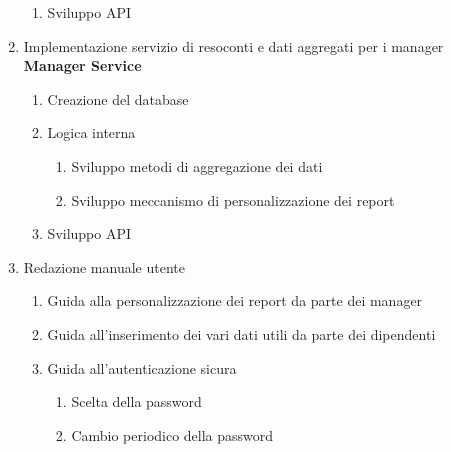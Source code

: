 \documentclass{article}
\begin{document}
\begin{enumerate}
\begin{enumerate}
        \item Sviluppo API
    \end{enumerate}
    \item Implementazione servizio di resoconti e dati 
        aggregati per i manager \textbf{Manager Service}
        \begin{enumerate}
            \item Creazione del database
            \item Logica interna
            \begin{enumerate}
                \item Sviluppo metodi di aggregazione dei dati
                \item Sviluppo meccanismo di personalizzazione dei report   
            \end{enumerate}
            \item Sviluppo API
        \end{enumerate}
    \item Redazione manuale utente
    \begin{enumerate}
        \item Guida alla personalizzazione dei report da parte dei manager
        \item Guida all'inserimento dei vari dati utili da parte dei dipendenti
        \item Guida all'autenticazione sicura
        \begin{enumerate}
            \item Scelta della password
            \item Cambio periodico della password
        \end{enumerate}
    \end{enumerate}
    \end{enumerate}


 
\end{document}
